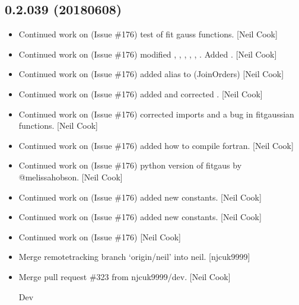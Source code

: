 \documentclass[a4paper,10pt,english]{report}
\begin{document}
\subsection{0.2.039 (2018\sphinxhyphen{}06\sphinxhyphen{}08)}
\label{\detokenize{misc/changelog:id443}}\begin{itemize}
\item {} 
Continued work on  (Issue \#176) \sphinxhyphen{} test of fit gauss functions.
{[}Neil Cook{]}

\item {} 
Continued work on  (Issue \#176) \sphinxhyphen{} modified
, , ,
, ,
. Added . {[}Neil Cook{]}

\item {} 
Continued work on  (Issue \#176) \sphinxhyphen{} added alias to
 (JoinOrders) {[}Neil Cook{]}

\item {} 
Continued work on  (Issue \#176) \sphinxhyphen{} added 
and corrected . {[}Neil Cook{]}

\item {} 
Continued work on  (Issue \#176) \sphinxhyphen{} corrected imports and a bug in
fitgaussian functions. {[}Neil Cook{]}

\item {} 
Continued work on  (Issue \#176) \sphinxhyphen{} added how to compile fortran.
{[}Neil Cook{]}

\item {} 
Continued work on  (Issue \#176) \sphinxhyphen{} python version of fitgaus by
@melissa\sphinxhyphen{}hobson. {[}Neil Cook{]}

\item {} 
Continued work on  (Issue \#176) \sphinxhyphen{} added new constants. {[}Neil
Cook{]}

\item {} 
Continued work on  (Issue \#176) \sphinxhyphen{} added new constants. {[}Neil
Cook{]}

\item {} 
Continued work on  (Issue \#176) {[}Neil Cook{]}

\item {} 
Merge remote\sphinxhyphen{}tracking branch ‘origin/neil’ into neil. {[}njcuk9999{]}

\item {} 
Merge pull request \#323 from njcuk9999/dev. {[}Neil Cook{]}

Dev

\end{itemize}
\end{document}
